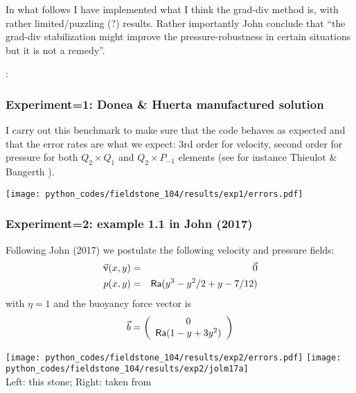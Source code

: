 In what follows I have implemented what I think the grad-div method is, with 
rather limited/puzzling (?) results.
Rather importantly John \etal conclude that ``the
grad-div stabilization might improve the pressure-robustness in certain situations but
it is not a remedy''. 

\Literature: \cite{ollh09}

\subsubsection*{Experiment=1: Donea \& Huerta manufactured solution}

I carry out this benchmark to make sure that the code behaves as expected and that the
error rates are what we expect: 3rd order for velocity, second order for pressure 
for both $Q_2\times Q_1$ and $Q_2\times P_{-1}$ elements (see for instance 
Thieulot \& Bangerth \cite{thba22}).

\begin{center}
\texttt{[image: python\_codes/fieldstone\_104/results/exp1/errors.pdf]}
\end{center}


\subsubsection*{Experiment=2: example 1.1 in John \etal (2017)}
Following John \etal (2017) \cite{jolm17} we 
postulate the following velocity and pressure fields:
\begin{eqnarray}
\vec{\upnu}(x,y) &=& \vec{0} \nonumber\\
p(x,y) &=& {\mathsf{Ra}} ( y^3-y^2/2+y-7/12 ) \nonumber
\end{eqnarray}
with $\eta=1$ and the buoyancy force vector is
\[
\vec{b}=
\left(
\begin{array}{c}
0 \\ {\mathsf{Ra}}(1-y+3y^2)
\end{array}
\right)
\]

\begin{center}
\texttt{[image: python\_codes/fieldstone\_104/results/exp2/errors.pdf]}
\texttt{[image: python\_codes/fieldstone\_104/results/exp2/jolm17a]}\\
{\captionfont Left: this stone; Right: taken from \cite{jolm17}}
\end{center}

